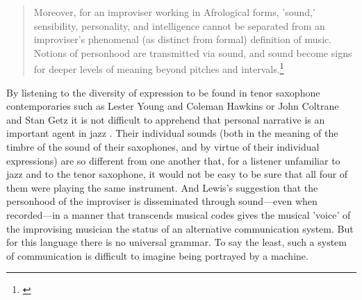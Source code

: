 \begin{quote}
  Moreover, for an improviser working in Afrological forms, 'sound,'
  sensibility, personality, and intelligence cannot be separated from
  an improviser's phenomenal (as distinct from formal) definition of
  music. Notions of personhood are transmitted via sound, and sound
  become signs for deeper levels of meaning beyond pitches and
  intervals.\footnote{\citet[p. 117]{lewis-1}}
\end{quote}
By listening to the diversity of expression to be found in tenor
saxophone contemporaries such as Lester Young and Coleman Hawkins or
John Coltrane and Stan Getz it is not difficult to apprehend that
personal narrative is an important agent in jazz . Their individual
sounds (both in the meaning of the timbre of the sound of their
saxophones, and by virtue of their individual expressions) are so
different from one another that, for a listener unfamiliar to
jazz and to the tenor saxophone, it would not be easy to be sure that
all four of them were playing the same instrument. And Lewis's
suggestion that the personhood of the improviser is disseminated
through sound---even when recorded---in a manner that transcends
musical codes gives the musical 'voice' of the improvising musician
the status of an alternative communication system. But for this
language there is no universal grammar. To say the least, such a
system of communication is difficult to imagine being portrayed by a
machine.

